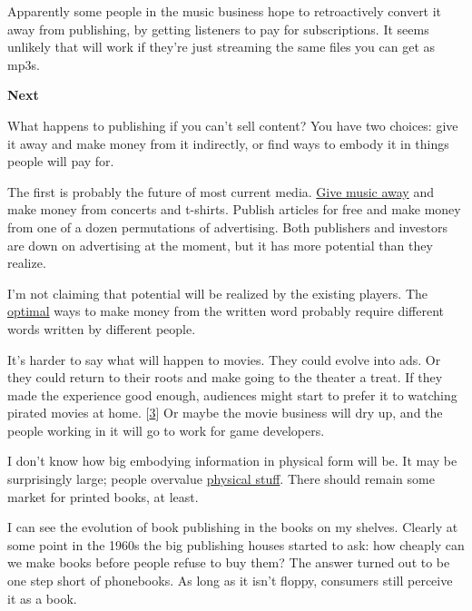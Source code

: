 Apparently
                  some people in the music business hope to retroactively
                  convert it away from publishing, by getting listeners to pay
                  for subscriptions. It seems unlikely that will work if they're
                  just streaming the same files you can get as mp3s.

\textbf{Next}

What happens to publishing if you can't sell
                  content? You have two choices: give it away and make money
                  from it indirectly, or find ways to embody it in things people
                  will pay for.

The first is probably the future of
                  most current media.
                  \href{http://thesixtyone.com}{Give music away} and make
                  money from concerts and t-shirts. Publish articles for free
                  and make money from one of a dozen permutations of
                  advertising. Both publishers and investors are down on
                  advertising at the moment, but it has more potential than they
                  realize.

I'm not claiming that potential will be
                  realized by the existing players. The
                  \href{http://ycombinator.com/rfs1.html}{optimal} ways to
                  make money from the written word probably require different
                  words written by different people.

It's harder to
                  say what will happen to movies. They could evolve into ads. Or
                  they could return to their roots and make going to the theater
                  a treat. If they made the experience good enough, audiences
                  might start to prefer it to watching pirated movies at home.
                  [\href{\#f3n}{3}]
                  Or maybe the movie business will dry up, and the people
                  working in it will go to work for game developers.

I
                  don't know how big embodying information in physical form will
                  be. It may be surprisingly large; people overvalue
                  \href{http://www.paulgraham.com/stuff.html}{physical stuff}. There should remain
                  some market for printed books, at least.

I can see
                  the evolution of book publishing in the books on my shelves.
                  Clearly at some point in the 1960s the big publishing houses
                  started to ask: how cheaply can we make books before people
                  refuse to buy them? The answer turned out to be one step short
                  of phonebooks. As long as it isn't floppy, consumers still
                  perceive it as a book.


